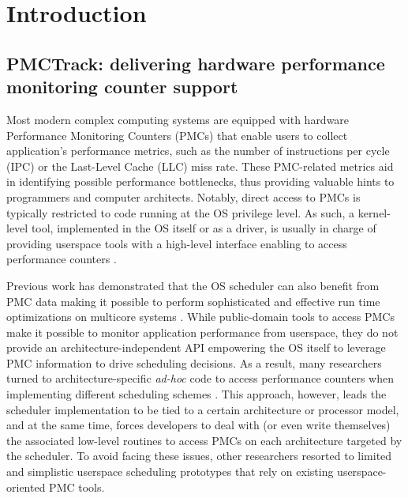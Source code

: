 \chapter{Introduction}


\section{PMCTrack: delivering hardware performance monitoring
counter support}\label{pmctrack-management-of-the-hardware-performance-monitoring-counters}

Most modern complex computing systems are equipped with hardware
Performance Monitoring Counters (PMCs) that enable users to collect
application's performance metrics, such as the number of instructions
per cycle (IPC) or the Last-Level Cache (LLC) miss rate. These
PMC-related metrics aid in identifying possible performance bottlenecks,
thus providing valuable hints to programmers and computer architects.
Notably, direct access to PMCs is typically restricted to code running
at the OS privilege level. As such, a kernel-level tool, implemented in
the OS itself or as a driver, is usually in charge of providing
userspace tools with a high-level interface enabling to access
performance counters \cite{perfevents,perfmon2,oprofile}.

Previous work has demonstrated that the OS scheduler can also benefit
from PMC data making it possible to perform sophisticated and effective
run time optimizations on multicore systems
\cite{observations,cache-aware-asplos,merkel-eurosys10,akula,intel-amp,camp,petrucci-tecs15,acfs}.
While public-domain tools to access PMCs make it possible to monitor
application performance from userspace, they do not provide an
architecture-independent API empowering the OS itself to leverage PMC
information to drive scheduling decisions. As a result, many researchers
turned to architecture-specific \textit{ad-hoc} code to access
performance counters when implementing different scheduling schemes
\cite{observations,intel-amp,camp,acfs}. This approach, however, leads
the scheduler implementation to be tied to a certain architecture or
processor model, and at the same time, forces developers to deal with
(or even write themselves) the associated low-level routines to access
PMCs on each architecture targeted by the scheduler. To avoid facing
these issues, other researchers resorted to limited and simplistic
userspace scheduling prototypes
\cite{cache-aware-asplos,akula,petrucci-tecs15} that rely on existing
userspace-oriented PMC tools.

